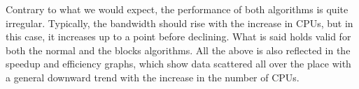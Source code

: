 



Contrary to what we would expect, the performance of both algorithms is quite %
irregular. Typically, the bandwidth should rise with the increase in CPUs, but %
in this case, it increases up to a point before declining. What is said holds %
valid for both the normal and the blocks algorithms. All the above is also %
reflected in the speedup and efficiency graphs, which show data scattered all %
over the place with a general downward trend with the increase in the number of CPUs.
